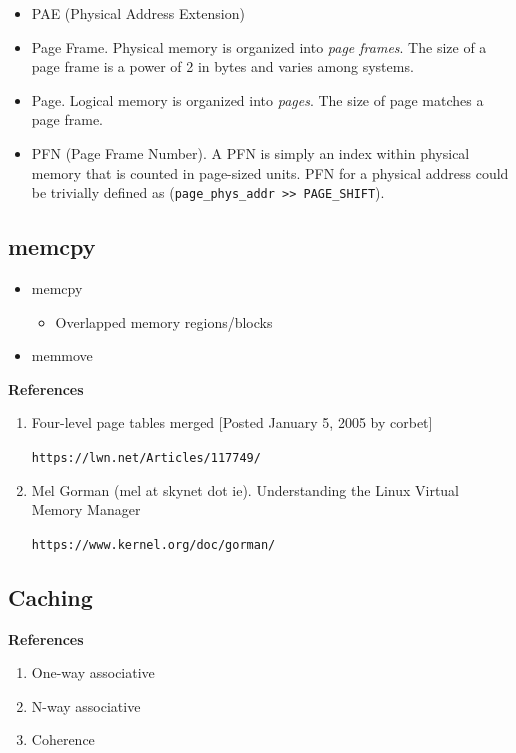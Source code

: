\documentclass[12pt,a4paper]{article}
\begin{document}
\begin{itemize}
\item PAE (Physical Address Extension)
\item Page Frame.  Physical memory is organized into \emph{page frames}.  The 
size of a page frame is a power of 2 in bytes and varies among systems.
\item Page.  Logical memory is organized into \emph{pages}. The size of page 
matches a page frame.
\item PFN (Page Frame Number).  A PFN is simply an index within physical memory 
that is counted in page-sized units. PFN for a physical address could be 
trivially defined as (\verb"page_phys_addr >> PAGE_SHIFT").
\end{itemize}

\subsection{memcpy}

\begin{itemize}
\item memcpy

	\begin{itemize}
	\item Overlapped memory regions/blocks
	\end{itemize}

\item memmove
\end{itemize}

\textbf{References}

\begin{enumerate}
\item Four-level page tables merged [Posted January 5, 2005 by corbet]

	\texttt{https://lwn.net/Articles/117749/}

\item Mel Gorman (mel at skynet dot ie).  Understanding the Linux Virtual Memory Manager

	\texttt{https://www.kernel.org/doc/gorman/}
\end{enumerate}

\subsection{Caching}

\textbf{References}

\begin{enumerate}
\item One-way associative
\item N-way associative
\item Coherence
\end{enumerate}
\end{document}
